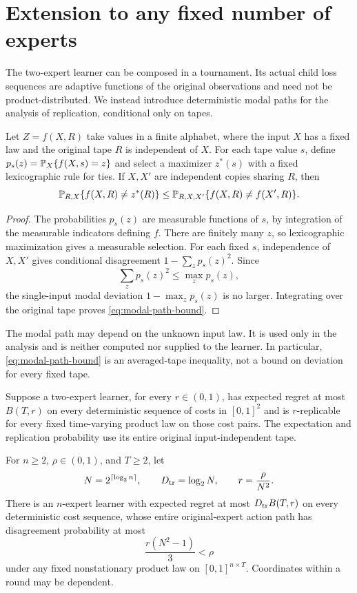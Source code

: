 \section{Extension to any fixed number of experts}
\label{sec:tournament}

The two-expert learner can be composed in a tournament. Its actual child
loss sequences are adaptive functions of the original observations and
need not be product-distributed. We instead introduce deterministic
modal paths for the analysis of replication, conditional only on tapes.

\begin{lemma}
\label{lem:modal-path}
Let $Z=f(X,R)$ take values in a finite alphabet, where the input $X$ has
a fixed law and the original tape $R$ is independent of $X$. For each
tape value $s$, define $p_s(z)=\mathbb P_X\{f(X,s)=z\}$ and select a maximizer
$z^*(s)$ with a fixed lexicographic rule for ties. If $X,X'$ are
independent copies sharing $R$, then
\begin{equation}
 \mathbb P_{R,X}\{f(X,R)\ne z^*(R)\}
 \le\mathbb P_{R,X,X'}\{f(X,R)\ne f(X',R)\}.
 \label{eq:modal-path-bound}
\end{equation}
\end{lemma}
\begin{proof}
The probabilities $p_s(z)$ are measurable functions of $s$, by integration
of the measurable indicators defining $f$. There are finitely many
$z$, so lexicographic maximization gives a measurable selection.
For each fixed $s$, independence of $X,X'$ gives conditional
disagreement $1-\sum_z p_s(z)^2$. Since
\[
 \sum_z p_s(z)^2\le\max_z p_s(z),
\]
the single-input modal deviation $1-\max_zp_s(z)$ is no larger.
Integrating over the original tape proves
\eqref{eq:modal-path-bound}.
\end{proof}

The modal path may depend on the unknown input law. It is used only in
the analysis and is neither computed nor supplied to the learner.
In particular, \eqref{eq:modal-path-bound} is an averaged-tape
inequality, not a bound on deviation for every fixed tape.

\begin{theorem}
\label{thm:tournament}
Suppose a two-expert learner, for every $r\in(0,1)$, has expected regret
at most $B(T,r)$ on every deterministic sequence of costs in $[0,1]^2$
and is $r$-replicable for every fixed time-varying product law on those
cost pairs. The expectation and replication probability use its entire
original input-independent tape.

For $n\ge2$, $\rho\in(0,1)$, and $T\ge2$, let
\[
 N=2^{\lceil\log_2 n\rceil},\qquad
 D_{\rm tr}=\log_2N,\qquad r=\frac{\rho}{N^2}.
\]
There is an $n$-expert learner with expected regret at most
$D_{\rm tr}B(T,r)$ on every deterministic cost sequence, whose entire
original-expert action path has disagreement probability at most
\begin{equation}
 \frac{r(N^2-1)}{3}<\rho
 \label{eq:tournament-replication-bound}
\end{equation}
under any fixed nonstationary product law on $[0,1]^{n\times T}$.
Coordinates within a round may be dependent.
\end{theorem}

